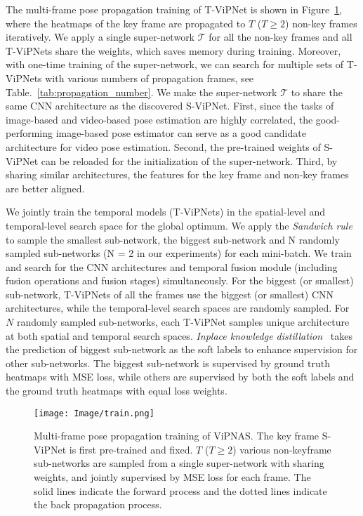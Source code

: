 \documentclass[final]{cvpr}
\begin{document}
The multi-frame pose propagation training of T-ViPNet is shown in Figure~\ref{fig:train&search}, where the heatmaps of the key frame are propagated to $T$ ($T \geq 2$) non-key frames iteratively. We apply a single super-network $\mathcal{T}$ for all the non-key frames and all T-ViPNets share the weights, which saves memory during training. Moreover, with one-time training of the super-network, we can search for multiple sets of T-ViPNets with various numbers of propagation frames, see Table.~\ref{tab:propagation_number}. We make the super-network $\mathcal{T}$ to share the same CNN architecture as the discovered S-ViPNet. First, since the tasks of image-based and video-based pose estimation are highly correlated, the good-performing image-based pose estimator can serve as a good candidate architecture for video pose estimation. Second, the pre-trained weights of S-ViPNet can be reloaded for the initialization of the super-network. Third, by sharing similar architectures, the features for the key frame and non-key frames are better aligned.

We jointly train the temporal models (T-ViPNets) in the spatial-level and temporal-level search space for the global optimum. We apply the \emph{Sandwich rule}~\cite{yu2019universally,yu2020bignas} to sample the smallest sub-network, the biggest sub-network and N randomly sampled sub-networks (N = 2 in our experiments) for each mini-batch. We train and search for the CNN architectures and temporal fusion module (including fusion operations and fusion stages) simultaneously. For the biggest (or smallest) sub-network, T-ViPNets of all the frames use the biggest (or smallest) CNN architectures, while the temporal-level search spaces are randomly sampled. For $N$ randomly sampled sub-networks, each T-ViPNet samples unique architecture at both spatial and temporal search spaces. 
\emph{Inplace knowledge distillation}~\cite{yu2019universally,yu2020bignas} takes the prediction of biggest sub-network as the soft labels to enhance supervision for other sub-networks. The biggest sub-network is supervised by ground truth heatmaps with MSE loss, while others are supervised by both the soft labels and the ground truth heatmaps with equal loss weights. 

\begin{figure}[htb]
	\centering
	\texttt{[image: Image/train.png]}
	\caption{Multi-frame pose propagation training of ViPNAS. The key frame S-ViPNet is first pre-trained and fixed. $T$ ($T \geq 2$) various non-keyframe sub-networks are sampled from a single super-network with sharing weights, and jointly supervised by MSE loss for each frame. The solid lines indicate the forward process and the dotted lines indicate the back propagation process.}
	\label{fig:train&search}
	\vspace{-8pt}
\end{figure}
\end{document}
